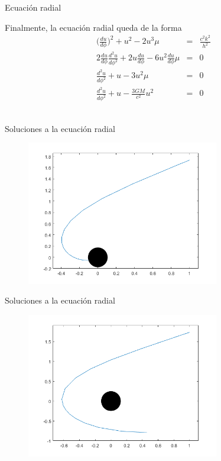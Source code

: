 \documentclass[xcolor=dvipsnames]{beamer}
\begin{document}
    \begin{frame}{Ecuación radial}
    \begin{block}{}
    Finalmente, la ecuación radial queda de la forma
          \begin{eqnarray*}
    \Big(\frac{du}{d\phi}\Big)^{2}+u^{2}-2u^{3}\mu&=&\frac{c^{2}k^{2}}{h^{2}} \\
    2\frac{du}{d\phi}\frac{d^{2}u}{d\phi^{2}}+2u\frac{du}{d\phi}-6u^{2}\frac{du}{d\phi}\mu&=&0\\
    \frac{d^{2}u}{d\phi^{2}}+u-3u^{2}\mu&=&0 \\
    \frac{d^{2}u}{d\phi^{2}}+u-\frac{3GM}{c^{2}}u^{2}&=&0    
    \end{eqnarray*}\\    
    \end{block}
  \end{frame}
  

    \begin{frame}{Soluciones a la ecuación radial}
\begin{figure}
    \centering
    \includegraphics[width=0.75\textwidth]{Presentations/Images/3_foton_en.png}
\end{figure}
  \end{frame}


    \begin{frame}{Soluciones a la ecuación radial}
\begin{figure}
    \centering
    \includegraphics[width=0.75\textwidth]{Presentations/Images/3_foton_esc.png}
\end{figure}
  \end{frame}
\end{document}
